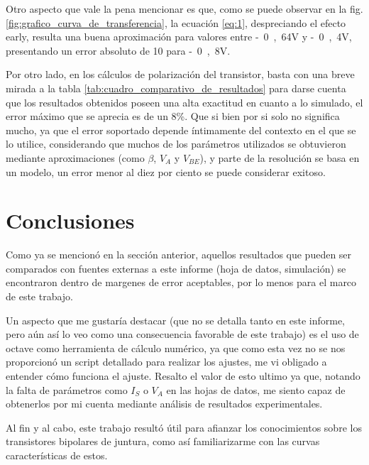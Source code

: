 \documentclass[10pt]{article}
\begin{document}
\quad Otro aspecto que vale la pena mencionar es que, como se puede observar en la fig. \ref{fig:grafico_curva_de_transferencia}, la ecuación \ref{eq:1},  despreciando el efecto early, resulta una buena aproximación para valores entre \si{-0,64}{V} y \si{-0,4}{V}, presentando un error absoluto de 10 para \si{-0,8}{V}.
 
\quad Por otro lado, en los  cálculos de polarización del transistor, basta con una breve mirada a la tabla \ref{tab:cuadro_comparativo_de_resultados} para darse cuenta que los resultados obtenidos poseen una alta exactitud en cuanto a lo simulado, el error máximo que se aprecia es de un 8\%. Que si bien por si solo no significa mucho, ya que el error soportado depende íntimamente del contexto en el que se lo utilice, considerando que muchos de los parámetros utilizados se obtuvieron mediante aproximaciones (como $\beta$, $V_A$ y $V_{BE}$), y parte de la resolución se basa en un modelo, un error menor al diez por ciento se puede considerar exitoso.

\section{Conclusiones} 

\quad Como ya se mencionó en la sección anterior, aquellos resultados que pueden ser comparados con fuentes externas a este informe (hoja de datos, simulación) se encontraron dentro de margenes de error aceptables, por lo menos para el marco de este trabajo. 

\quad Un aspecto que me gustaría destacar (que no se detalla tanto en este informe, pero aún así lo veo como una consecuencia favorable de este trabajo) es el uso de octave como herramienta de cálculo numérico, ya que como esta vez no se nos proporcionó un script detallado para realizar los ajustes, me vi obligado a entender cómo funciona el ajuste. Resalto el valor de esto ultimo ya que, notando la falta de parámetros como $I_S$ o $V_A$ en las hojas de datos, me siento capaz de obtenerlos por mi cuenta mediante análisis de resultados experimentales.

\quad Al fin y al cabo, este trabajo resultó útil para afianzar los conocimientos sobre los transistores bipolares de juntura, como así familiarizarme con las curvas características de estos.
\end{document}
